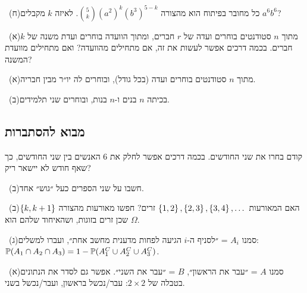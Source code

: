 \documentclass[12pt, a4paper]{article}
\begin{document}
\noindent {}\ (ח)\enskip כל מחובר בפיתוח הוא מהצורה $\binom5k(a^2)^k(b^3)^{5-k}$. לאיזה $k$ מקבלים $a^6b^6$?\par\smallskip
\noindent {}\ (א)\enskip מתוך $n$ סטודנטים בוחרים ועדה של $r$ חברים, ומתוך הוועדה בוחרים ועדת משנה של $k$ חברים. בכמה דרכים אפשר לעשות את זה, אם מתחילים מהוועדה? ואם מתחילים מוועדת המשנה?\par\smallskip
\noindent {}\ (א)\enskip מתוך $n$ סטודנטים בוחרים ועדה (בכל גודל), ובוחרים לה יו״ר מבין חבריה.\par\smallskip
\noindent {}\ (ב)\enskip בכיתה $n$ בנים ו-$n$ בנות, ובוחרים שני תלמידים.\par\smallskip

\subsection*{מבוא להסתברות}
\noindent {}\enskip קודם בחרו את שני החודשים. בכמה דרכים אפשר לחלק את 6 האנשים בין שני החודשים, כך שאף חודש לא יישאר ריק?\par\smallskip
\noindent {}\ (ב)\enskip חשבו על שני הספרים כעל ״גוש״ אחד.\par\smallskip
\noindent {}\ (ב)\enskip האם המאורעות $\left\{1,2\right\},\left\{2,3\right\},\left\{3,4\right\},\dots$ זרים? חפשו מאורעות מהצורה $\left\{k,k+1\right\}$ שכן זרים בזוגות, ושהאיחוד שלהם הוא $\Omega$.\par\smallskip
\noindent {}\ (ג)\enskip סמנו $A_i$ = ״לסניף ה-$i$ הגיעה לפחות מדענית מחשב אחת״, ועברו למשלים: $\mathbb{P}(A_1\cap A_2\cap A_3)=1-\mathbb{P}(A_1^C\cup A_2^C\cup A_3^C)$.\par\smallskip
\noindent {}\ (א)\enskip סמנו $A$ = ״עבר את הראשון״, $B$ = ״עבר את השני״. אפשר גם לסדר את הנתונים בטבלה של $2\times2$: עבר/נכשל בראשון, ועבר/נכשל בשני.\par\smallskip
\end{document}
